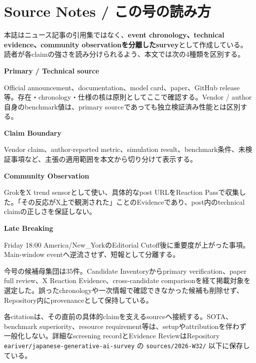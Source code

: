 \section*{Source Notes / この号の読み方}

本誌はニュース記事の引用集ではなく、\textbf{event chronology、technical evidence、community observationを分離したsurvey}として作成している。読者が各claimの強さを読み分けられるよう、本文では次の4種類を区別する。

\begin{tcolorbox}[enhanced,breakable,colback=SurveySoft,colframe=SurveyRule,boxrule=0.4pt,arc=1mm,left=3mm,right=3mm,top=2mm,bottom=2mm]
\textbf{Primary / Technical source}\par
Official announcement、documentation、model card、paper、GitHub release等。存在・chronology・仕様の核は原則としてここで確認する。Vendor / author自身のbenchmark値は、primary sourceであっても独立検証済み性能とは区別する。\par\smallskip
\textbf{Claim Boundary}\par
Vendor claim、author-reported metric、simulation result、benchmark条件、未検証事項など、主張の適用範囲を本文から切り分けて表示する。\par\smallskip
\textbf{Community Observation}\par
GrokをX trend sensorとして使い、具体的なpost URLをReaction Passで収集した。「その反応がX上で観測された」ことのEvidenceであり、post内のtechnical claimの正しさを保証しない。\par\smallskip
\textbf{Late Breaking}\par
Friday 18:00 America/New\_YorkのEditorial Cutoff後に重要度が上がった事項。Main-window eventへ逆流させず、短報として分離する。
\end{tcolorbox}

今号の候補母集団は35件。Candidate Inventoryからprimary verification、paper full review、X Reaction Evidence、cross-candidate comparisonを経て掲載対象を選定した。誤ったchronologyや一次情報で確認できなかった候補も削除せず、Repository内にprovenanceとして保持している。

各citationは、その直前の具体的claimを支えるsourceへ接続する。SOTA、benchmark superiority、resource requirement等は、setupやattributionを伴わず一般化しない。詳細なscreening recordとEvidence ReviewはRepository \texttt{eariver/japanese-generative-ai-survey} の \texttt{sources/2026-W32/} 以下に保存している\cite{repo2026w32}。
